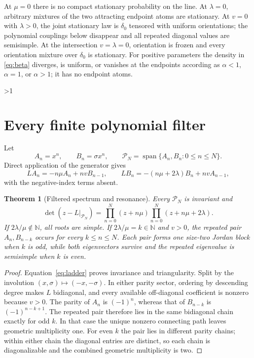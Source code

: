 \documentclass[10pt]{article}
\providecommand{\CRevisionRound}{2}
\newtheorem{theorem}{Theorem}
\begin{document}
At $\mu=0$ there is no compact stationary probability on the line.  At
$\lambda=0$, arbitrary mixtures of the two attracting endpoint atoms are
stationary.  At $v=0$ with $\lambda>0$, the joint stationary law is
$\delta_0$ tensored with uniform orientations; the polynomial couplings
below disappear and all repeated diagonal values are semisimple.  At the
intersection $v=\lambda=0$, orientation is frozen and every orientation
mixture over $\delta_0$ is stationary.  For positive parameters the density in
\eqref{eq:beta} diverges, is uniform, or vanishes at the endpoints according
as $\alpha<1$, $\alpha=1$, or $\alpha>1$; it has no endpoint atoms.
\fi

\ifnum\CRevisionRound>1
\section{Every finite polynomial filter}
Let
\[
 A_n=x^n,\qquad B_n=\sigma x^n,\qquad
 \mathcal P_N=\operatorname{span}\{A_n,B_n:0\leq n\leq N\}.
\]
Direct application of the generator gives
\begin{equation}\label{eq:ladder}
 LA_n=-n\mu A_n+nvB_{n-1},\qquad
 LB_n=-(n\mu+2\lambda)B_n+nvA_{n-1},
\end{equation}
with the negative-index terms absent.

\begin{theorem}[Filtered spectrum and resonance]\label{thm:spectrum}
Every $\mathcal P_N$ is invariant and
\[
 \det(z-L|_{\mathcal P_N})=
 \prod_{n=0}^N(z+n\mu)\prod_{n=0}^N(z+n\mu+2\lambda).
\]
If $2\lambda/\mu\notin\mathbb N$, all roots are simple.  If
$2\lambda/\mu=k\in\mathbb N$ and $v>0$, the repeated pair
$A_n,B_{n-k}$ occurs for every $k\leq n\leq N$.  Each pair forms one
size-two Jordan block when $k$ is odd, while both eigenvectors survive and
the repeated eigenvalue is semisimple when $k$ is even.
\end{theorem}
\begin{proof}
Equation~\eqref{eq:ladder} proves invariance and triangularity.  Split by
the involution $(x,\sigma)\mapsto(-x,-\sigma)$.  In either parity sector,
ordering by descending degree makes $L$ bidiagonal, and every available
off-diagonal coefficient is nonzero because $v>0$.  The parity of $A_n$ is
$(-1)^n$, whereas that of $B_{n-k}$ is $(-1)^{n-k+1}$.  The repeated pair
therefore lies in the same bidiagonal chain exactly for odd $k$.  In that
case the unique nonzero connecting path leaves geometric multiplicity one.
For even $k$ the pair lies in different parity chains; within either chain
the diagonal entries are distinct, so each chain is diagonalizable and the
combined geometric multiplicity is two.
\end{proof}
\end{document}
